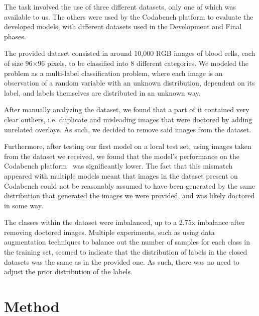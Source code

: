 \documentclass[11pt]{article}
\begin{document}
\begin{multicols}{2}

      The task involved the use of three different datasets, only one of which was available to us. The others were used by the Codabench platform to evaluate the developed models, with different datasets used in the Development and Final phases.

      The provided dataset consisted in around 10,000 RGB images of blood cells, each of size 96\(\times\)96 pixels, to be classified into 8 different categories. We modeled the problem as a multi-label classification problem, where each image is an observation of a random variable with an unknown distribution, dependent on its label, and labels themselves are distributed in an unknown way.
      
      After manually analyzing the dataset, we found that a part of it contained very clear outliers, i.e. duplicate and misleading images that were doctored by adding unrelated overlays. As such, we decided to remove said images from the dataset.

      Furthermore, after testing our first model on a local test set, using images taken from the dataset we received, we found that the model's performance on the Codabench platform~\cite{codabench} was significantly lower. The fact that this mismatch appeared with multiple models meant that images in the dataset present on Codabench could not be reasonably assumed to have been generated by the same distribution that generated the images we were provided, and was likely doctored in some way.

      The classes within the dataset were imbalanced, up to a 2.75x imbalance after removing doctored images. Multiple experiments, such as using data  augmentation techniques to balance out the number of samples for each class in the training set, seemed to indicate that the distribution of labels in the closed datasets was the same as in the provided one. As such, there was no need to adjust the prior distribution of the labels.

      \section{Method}


\end{multicols}
\end{document}
